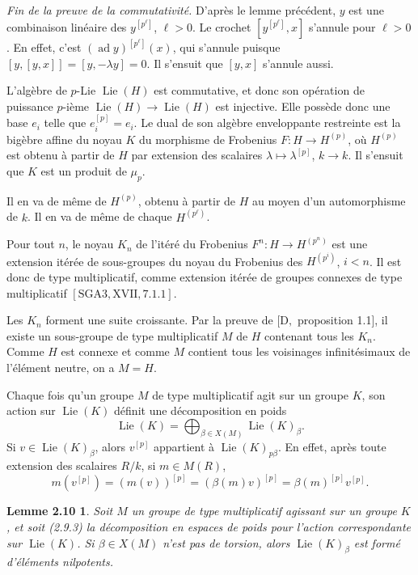 \documentclass[11pt]{article}
\newcommand{\Lie}{\operatorname{Lie}}
\newtheorem*{lemme210}{Lemme 2.10}
\begin{document}
\noindent\emph{Fin de la preuve de la commutativité.}
D'après le lemme précédent, \(y\) est une combinaison linéaire des \(y^{[p^\ell]}\),
\(\ell>0\). Le crochet \([y^{[p^\ell]},x]\) s'annule pour \(\ell>0\). En effet, c'est
\((\operatorname{ad}y)^{[p^\ell]}(x)\), qui s'annule puisque
\([y,[y,x]]=[y,-\lambda y]=0\). Il s'ensuit que \([y,x]\) s'annule aussi.

L'algèbre de \(p\)-Lie \(\Lie(H)\) est commutative, et donc son opération de puissance
\(p\)-ième \(\Lie(H)\to\Lie(H)\) est injective. Elle possède donc une base \(e_i\) telle
que \(e_i^{[p]}=e_i\). Le dual de son algèbre enveloppante restreinte est la bigèbre
affine du noyau \(K\) du morphisme de Frobenius \(F:H\to H^{(p)}\), où \(H^{(p)}\) est
obtenu à partir de \(H\) par extension des scalaires \(\lambda\mapsto\lambda^{[p]}\),
\(k\to k\). Il s'ensuit que \(K\) est un produit de \(\mu_p\).

Il en va de même de \(H^{(p)}\), obtenu à partir de \(H\) au moyen d'un automorphisme de
\(k\). Il en va de même de chaque \(H^{(p^\ell)}\).

Pour tout \(n\), le noyau \(K_n\) de l'itéré du Frobenius
\(F^n:H\to H^{(p^n)}\) est une extension itérée de sous-groupes du noyau du Frobenius
des \(H^{(p^i)}\), \(i<n\). Il est donc de type multiplicatif, comme extension itérée
de groupes connexes de type multiplicatif \([\mathrm{SGA3},\mathrm{XVII},7.1.1]\).

Les \(K_n\) forment une suite croissante. Par la preuve de \([\mathrm D,\) proposition
1.1], il existe un sous-groupe de type multiplicatif \(M\) de \(H\) contenant tous les
\(K_n\). Comme \(H\) est connexe et comme \(M\) contient tous les voisinages
infinitésimaux de l'élément neutre, on a \(M=H\).

Chaque fois qu'un groupe \(M\) de type multiplicatif agit sur un groupe \(K\), son
action sur \(\Lie(K)\) définit une décomposition en poids
\begin{equation}
  \Lie(K)=\bigoplus_{\beta\in X(M)}\Lie(K)_\beta .
  \tag{2.9.3}
\end{equation}
Si \(v\in\Lie(K)_\beta\), alors \(v^{[p]}\) appartient à \(\Lie(K)_{p\beta}\). En effet,
après toute extension des scalaires \(R/k\), si \(m\in M(R)\),
\begin{equation}
  m(v^{[p]})=(m(v))^{[p]}=(\beta(m)v)^{[p]}=\beta(m)^{[p]}v^{[p]}.
  \tag{2.9.4}
\end{equation}

\begin{lemme210}
Soit \(M\) un groupe de type multiplicatif agissant sur un groupe \(K\), et soit
(2.9.3) la décomposition en espaces de poids pour l'action correspondante sur
\(\Lie(K)\). Si \(\beta\in X(M)\) n'est pas de torsion, alors \(\Lie(K)_\beta\) est
formé d'éléments nilpotents.
\end{lemme210}
\end{document}
